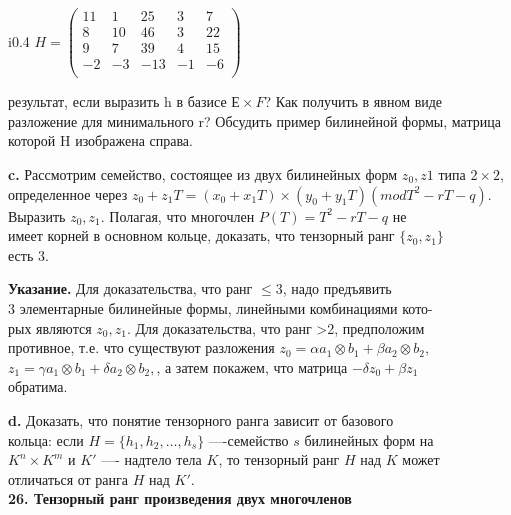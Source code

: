 \documentclass{mai_book}
\begin{document}
\begin{wrapfigure}{i}{0.4\textwidth}
$H = \begin{pmatrix}
11&1&25&3&7\\
8&10&46&3&22\\
9&7&39&4&15\\
-2&-3&-13&-1&-6\\
\end{pmatrix}$
\end{wrapfigure}

результат, если выразить h в базисе $Е \times F$? Как получить в явном виде разложение для минимального r? Обсудить пример билинейной формы, матрица которой H изображена справа.


\textbf{c.} Рассмотрим семейство, состоящее из двух билинейных форм $z_{0},z{1}$ типа $2 \times 2$, определенное через $z_0 + z_1T = (x_0 + x_1T) \times (y_0 + y_1T)(mod T^2 - rT - q)$.\newpage
\indent Выразить $z_0, z_1$. Полагая, что многочлен $P(T) = T^2 - rT - q$ не\\имеет корней в основном кольце, доказать, что тензорный ранг $\{z_0, z_1 \}$ \\ есть 3.

\textbf{Указание.} Для доказательства, что ранг $\leqslant 3$, надо предъявить \\ 3 элементарные билинейные формы, линейными комбинациями кото-\\рых являются $z_0, z_1$. Для доказательства, что ранг >2, предположим\\ противное, т.е. что существуют разложения $z_0 = \alpha a_1 \otimes b_1 + \beta a_2 \otimes b_2, $ \\ $z_1 = \gamma a_1 \otimes b_1 + \delta a_2 \otimes b_2, $, а затем покажем, что матрица $ -\delta z_0 + \beta z_1$ \\ обратима.

\textbf{d.} \quad Доказать, что понятие тензорного ранга зависит от базового \\ кольца: если $H = \{ h_1, h_2, \ldots, h_s \}$ —-семейство $s$ билинейных форм на \\ $K^n \times K^m$ и $K'$ —- надтело тела $K$, то тензорный ранг $H$ над $K$ может \\ отличаться от ранга $H$ над $K'$.\\

\noindent \textbf{26. \quad Тензорный ранг произведения двух многочленов}
\end{document}
